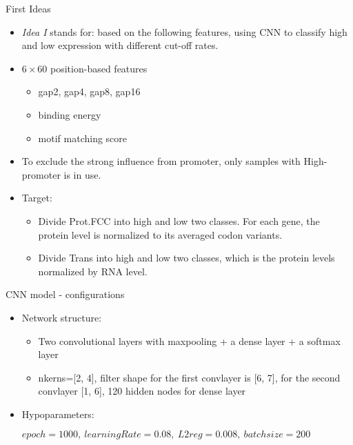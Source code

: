 \documentclass[xcolor=svgnames,handout]{beamer}
\begin{document}
\begin{frame}{First Ideas}
    \begin{itemize}
    \item {\it Idea I} stands for: based on the following features, using CNN to classify high and low expression with different cut-off rates. 
    \item $6\times60$ position-based features
        \begin{itemize}
        \item gap2, gap4, gap8, gap16
        \item binding energy
        \item motif matching score
        \end{itemize}
    \item{To exclude the strong influence from promoter, only samples with High-promoter is in use.}
    \item Target: 
        \begin{itemize}
        \item Divide Prot.FCC into high and low two classes. For each gene, the protein level is normalized to its averaged codon variants.
        \item Divide Trans into high and low two classes, which is the protein levels normalized by RNA level. 
        \end{itemize}
    
    
    
    \end{itemize}



\end{frame}

\begin{frame}{CNN model - configurations}
\begin{itemize}
\item Network structure:
    \begin{itemize}
    \item Two convolutional layers with maxpooling + a dense layer + a softmax layer
    \item nkerns=[2, 4], filter shape for the first convlayer is [6, 7], for the second convlayer [1, 6], 120 hidden nodes for dense layer
    \end{itemize}
\item Hypoparameters:

$epoch=1000,\ learningRate = 0.08,\ L2reg=0.008, \ batchsize=200$
\end{itemize}


\end{frame}
  
\end{document}
